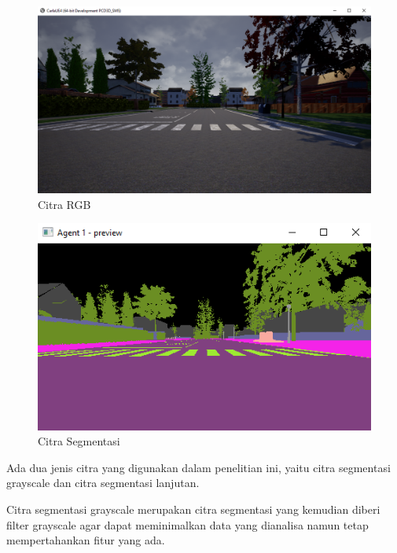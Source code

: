 \documentclass[conference]{IEEEtran}
\begin{document}
\begin{figure}[H] 
	\centering
	\includegraphics[width=1\linewidth]{images/rgb}
	\caption{Citra RGB}
	\label{fig:citra_rgb}
\end{figure}
\begin{figure}[H] 
	\centering
	\includegraphics[width=1\linewidth]{images/segmentasi}
	\caption{Citra Segmentasi}
	\label{fig:segmentasi}
\end{figure}
Ada dua jenis citra yang digunakan dalam penelitian ini, yaitu citra segmentasi grayscale dan citra segmentasi lanjutan.

Citra segmentasi grayscale merupakan citra segmentasi yang kemudian diberi filter grayscale agar dapat meminimalkan data yang dianalisa namun tetap mempertahankan fitur yang ada.
\end{document}
